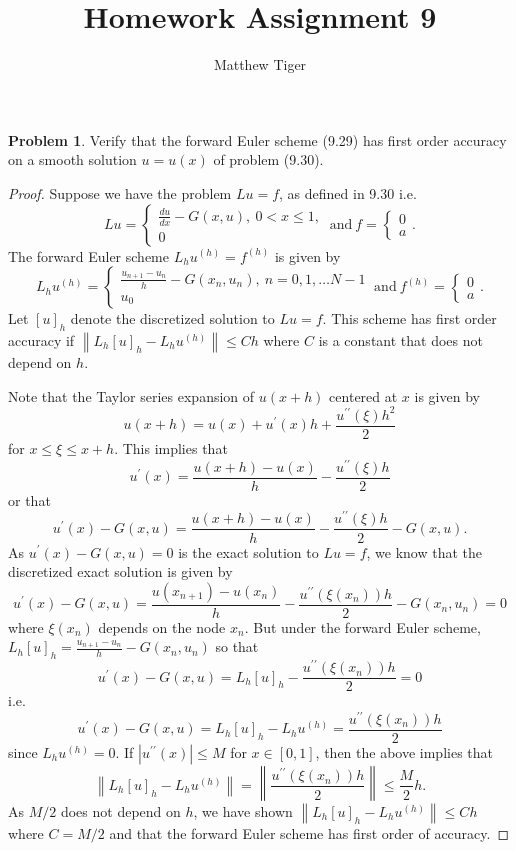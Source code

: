 \documentclass[12pt]{article}
\title{Homework Assignment 9}
\author{Matthew Tiger}
\theoremstyle{definition}
\newtheorem{problem}{Problem}
\newcommand\norm[1]{\left\lVert#1\right\rVert}
\begin{document}
\maketitle
\begin{problem} Verify that the forward Euler scheme (9.29) has first order
  accuracy on a smooth solution $u=u(x)$ of problem (9.30).
\end{problem}

\begin{proof}
  Suppose we have the problem $Lu = f$, as defined in 9.30 i.e.
  \[
      Lu =
      \begin{cases}
        \frac{du}{dx} - G(x, u),\ 0 < x \leq 1, \\
        0
      \end{cases}
      \ \text{and} \
      f =
      \begin{cases}
        0 \\
        a
      \end{cases}.
  \]
  The forward Euler scheme $L_hu^{(h)} = f^{(h)}$ is given by
  \[
      L_hu^{(h)} =
      \begin{cases}
        \frac{u_{n+1} - u_{n}}{h} - G(x_n, u_n),\  n = 0, 1, \dots N-1 \\
        u_0
      \end{cases}
      \ \text{and} \
      f^{(h)} =
      \begin{cases}
        0 \\
        a
      \end{cases}.
  \]
  Let $[u]_h$ denote the discretized solution to $Lu = f$. This scheme has
  first order accuracy if $\norm{L_h[u]_h - L_hu^{(h)}} \leq C h$ where
  $C$ is a constant that does not depend on $h$.

  Note that the Taylor series expansion of $u(x + h)$ centered at $x$ is given by
  \[
    u(x + h) = u(x) + u^{\prime}(x) h + \frac{u^{\prime \prime}(\xi) h^2}{2}
  \]
  for $x \leq \xi \leq x+h$. This implies that
  \[
    u^{\prime}(x) = \frac{u(x+h) - u(x)}{h} - \frac{u^{\prime \prime}(\xi) h}{2}
  \]
  or that
  \[
    u^{\prime}(x) - G(x, u) = \frac{u(x+h) - u(x)}{h} - \frac{u^{\prime \prime}(\xi) h}{2} - G(x, u).
  \]
  As $u^{\prime}(x) - G(x, u) = 0$ is the exact solution to $Lu = f$, we know that the
  discretized exact solution is given by
  \[
    u^{\prime}(x) - G(x, u) = \frac{u(x_{n+1}) - u(x_n)}{h} - \frac{u^{\prime \prime}(\xi(x_n)) h}{2} - G(x_n, u_n) = 0
  \]
  where $\xi(x_n)$ depends on the node $x_n$. But under the forward Euler scheme,
  $L_h[u]_h = \frac{u_{n+1} - u_{n}}{h} - G(x_n, u_n)$ so that
  \[
    u^{\prime}(x) - G(x, u) = L_h[u]_h - \frac{u^{\prime \prime}(\xi(x_n)) h}{2} = 0
  \]
  i.e.
  \[
    u^{\prime}(x) - G(x, u) = L_h[u]_h - L_h u^{(h)} = \frac{u^{\prime \prime}(\xi(x_n)) h}{2}
  \]
  since $L_h u^{(h)} = 0$. If $|u^{\prime \prime}(x)| \leq M$ for $x \in [0, 1]$, then
  the above implies that
  \[
    \norm{L_h[u]_h - L_h u^{(h)}} = \norm{\frac{u^{\prime \prime}(\xi(x_n)) h}{2}} \leq \frac{M}{2} h.
  \]
  As $M/2$ does not depend on $h$, we have shown $\norm{L_h[u]_h - L_h u^{(h)}} \leq C h$
  where $C = M/2$ and that the forward Euler scheme has first order of accuracy.
\end{proof}
\end{document}
